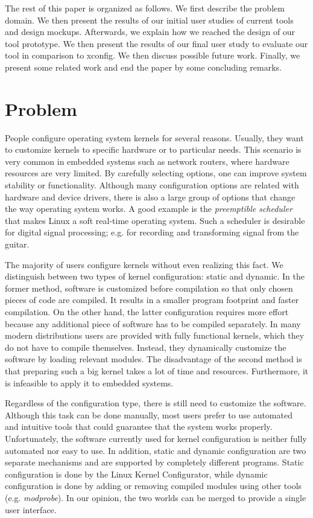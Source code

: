 \documentclass{chi2009}
\begin{document}
The rest of this paper is organized as follows. We first describe the problem domain. We then present the results of our initial user studies of current tools
and design mockups. Afterwards, we explain how we reached the design of our tool prototype. We then present the results of our final user study to evaluate our
tool in comparison to \textsf{xconfig}. We then discuss possible future work. Finally, we present some related work and end the paper by some concluding
remarks.

\section{Problem}\label{sec:problem}

People configure operating system kernels for several reasons. Usually, they want to customize kernels to specific hardware or to particular needs. This
scenario is very common in embedded systems such as network routers, where hardware resources are very limited. By carefully selecting options, one can improve
system stability or functionality. Although many configuration options are related with hardware and device drivers, there is also a large group of options that
change the way operating system works. A good example is the \textit{preemptible scheduler} that makes Linux a soft real-time operating system. Such a scheduler
is desirable for digital signal processing; e.g. for recording and transforming signal from the guitar.

The majority of users configure kernels without even realizing this fact. We distinguish between two types of kernel configuration: static and dynamic. In the
former method, software is customized before compilation so that only chosen pieces of code are compiled. It results in a smaller program footprint and faster
compilation. On the other hand, the latter configuration requires more effort because any additional piece of software has to be compiled separately. In many
modern distributions users are provided with fully functional kernels, which they do not have to compile themselves. Instead, they dynamically customize the
software by loading relevant modules. The disadvantage of the second method is that preparing such a big kernel takes a lot of time and resources. Furthermore,
it is infeasible to apply it to embedded systems.

Regardless of the configuration type, there is still need to customize the software. Although this task can be done manually, most users prefer to use automated
and intuitive tools that could guarantee that the system works properly. Unfortunately, the software currently used for kernel configuration is neither fully
automated nor easy to use. In addition, static and dynamic configuration are two separate mechanisms and are supported by completely different programs. Static
configuration is done by the Linux Kernel Configurator, while dynamic configuration is done by adding or removing compiled modules using other tools (e.g.
\textit{modprobe}). In our opinion, the two worlds can be merged to provide a single user interface.
\end{document}
